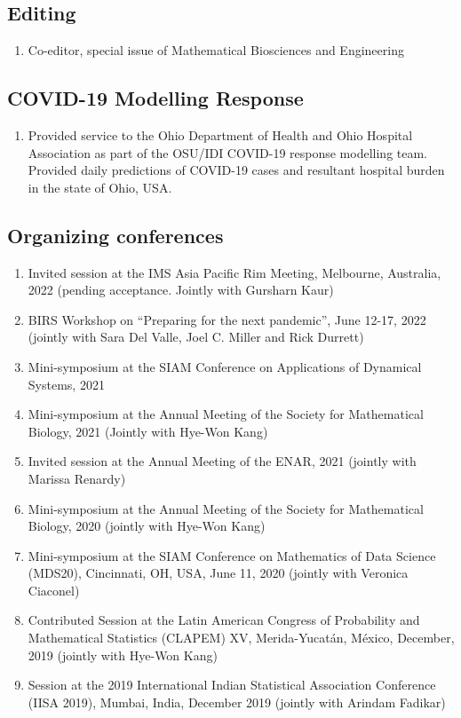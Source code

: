 \documentclass[11pt,a4paper,sans]{moderncv}        %
\begin{document}
\subsection{Editing}
\begin{enumerate}
	\item Co-editor, special issue of Mathematical Biosciences and Engineering 
\end{enumerate}

\subsection{COVID-19 Modelling Response}
\begin{enumerate}
	\item Provided service to the Ohio Department of Health and Ohio Hospital Association as part of the OSU/IDI COVID-19 response modelling team. Provided daily predictions of COVID-19 cases and resultant hospital burden in the state of Ohio, USA. 
\end{enumerate}

\subsection{Organizing conferences}
\begin{enumerate}
	\item  {Invited session at the IMS Asia Pacific Rim Meeting, Melbourne, Australia, 2022 (pending acceptance. Jointly with Gursharn Kaur)}
	\item BIRS Workshop on ``Preparing for the next pandemic'', June 12-17, 2022 (jointly with Sara Del Valle, Joel C. Miller and Rick Durrett) 
	\item Mini-symposium at the SIAM Conference on Applications of Dynamical Systems, 2021 
	\item {Mini-symposium at the Annual Meeting of the Society for Mathematical Biology, 2021 (Jointly with Hye-Won Kang)}
	\item {Invited session at the Annual Meeting of the ENAR, 2021 (jointly with Marissa Renardy)}
	\item {Mini-symposium at the Annual Meeting of the Society for Mathematical Biology, 2020 (jointly with Hye-Won Kang)}
	\item {Mini-symposium at the SIAM Conference on Mathematics of Data Science (MDS20), Cincinnati, OH, USA, June 11, 2020 (jointly with Veronica Ciaconel)  }
\item {Contributed Session at the Latin American Congress of Probability and Mathematical Statistics (CLAPEM) XV, Merida-Yucatán, México, December, 2019 (jointly with Hye-Won Kang)}
\item {Session at the 2019 International Indian Statistical Association Conference (IISA 2019), Mumbai, India, December 2019 (jointly with Arindam Fadikar)
}
\end{enumerate}
\end{document}
